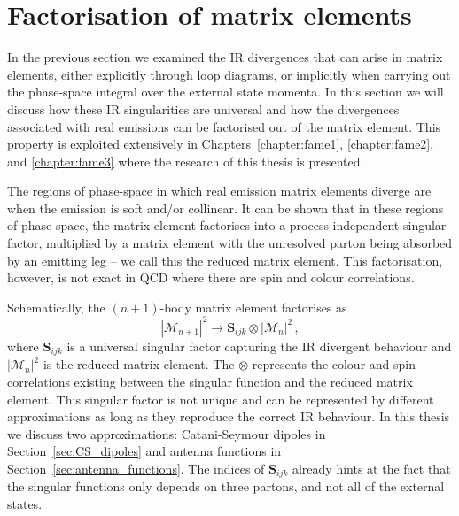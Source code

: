 \documentclass[main.tex]{subfiles}
\begin{document}
\section{Factorisation of matrix elements}\label{sec:me_factorisation}
    In the previous section we examined the IR divergences
    that can arise in matrix elements, either explicitly
    through loop diagrams, or implicitly when carrying
    out the phase-space integral over the external state
    momenta. In this section we will discuss how these IR
    singularities are universal and how the divergences
    associated with real emissions can be factorised out
    of the matrix element. This property is exploited
    extensively in Chapters~\ref{chapter:fame1}, \ref{chapter:fame2},
    and \ref{chapter:fame3}
    where the research of this thesis is presented.

    The regions of phase-space in which real emission
    matrix elements diverge are when the emission is
    soft and/or collinear. It can be shown that in these
    regions of phase-space, the matrix element factorises
    into a process-independent singular factor, multiplied
    by a matrix element with the unresolved parton
    being absorbed by an emitting leg -- we call this the reduced matrix
    element. This factorisation, however, is not exact
    in QCD where there are spin and colour correlations.

    Schematically, the $(n+1)$-body matrix element
    factorises as
    \begin{equation}\label{eqn:me_factorisation}
        |\mathcal{M}_{n+1}|^{2} \rightarrow \bm{S}_{ijk} \otimes |\mathcal{M}_{n}|^{2} \, ,
    \end{equation}
    where $\bm{S}_{ijk}$ is a universal singular factor capturing
    the IR divergent behaviour and $|\mathcal{M}_{n}|^{2}$
    is the reduced matrix element. The $\otimes$
    represents the colour and spin correlations existing
    between the singular function and the reduced matrix element.
    This singular factor
    is not unique and can be represented by different
    approximations as long as they reproduce the
    correct IR behaviour. In this thesis we discuss
    two approximations: Catani-Seymour dipoles \cite{Catani:1996vz}
    in Section~\ref{sec:CS_dipoles} and antenna functions \cite{Gehrmann-DeRidder:2005btv}
    in Section~\ref{sec:antenna_functions}. The indices
    of $\bm{S}_{ijk}$ already hints at the fact that the singular
    functions only depends on three partons, and not all
    of the external states.
\end{document}
